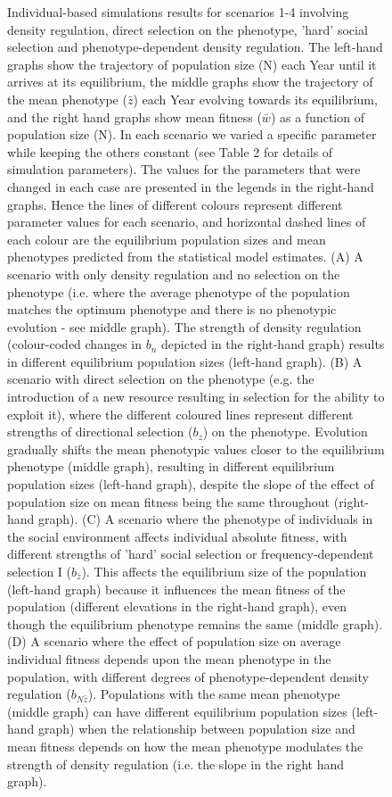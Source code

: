 \documentclass{article}
\begin{document}
\begin{figure}[ht]
	\caption{Individual-based simulations results for scenarios 1-4 involving density regulation, direct selection on the phenotype, 'hard' social selection and phenotype-dependent density regulation. The left-hand graphs show the trajectory of population size (N) each Year until it arrives at its equilibrium, the middle graphs show the trajectory of the mean phenotype ($\bar{z}$) each Year evolving towards its equilibrium, and the right hand graphs show mean fitness ($\bar{w}$) as a function of population size (N). In each scenario we varied a specific parameter while keeping the others constant (see Table 2 for details of simulation parameters). The values for the parameters that were changed in each case are presented in the legends in the right-hand graphs. Hence the lines of different colours represent different parameter values for each scenario, and horizontal dashed lines of each colour are the equilibrium population sizes and mean phenotypes predicted from the statistical model estimates. (A) A scenario with only density regulation and no selection on the phenotype (i.e. where the average phenotype of the population matches the optimum phenotype and there is no phenotypic evolution - see middle graph). The strength of density regulation (colour-coded changes in $b_n$ depicted in the right-hand graph) results in different equilibrium population sizes (left-hand graph). (B) A scenario with direct selection on the phenotype (e.g. the introduction of a new resource resulting in selection for the ability to exploit it), where the different coloured lines represent different strengths of directional selection ($b_z$) on the phenotype. Evolution gradually shifts the mean phenotypic values closer to the equilibrium phenotype (middle graph), resulting in different equilibrium population sizes (left-hand graph), despite the slope of the effect of population size on mean fitness being the same throughout (right-hand graph). (C) A scenario where the phenotype of individuals in the social environment affects individual absolute fitness, with different strengths of 'hard' social selection or frequency-dependent selection I ($b_{\bar{z}}$). This affects the equilibrium size of the population (left-hand graph) because it influences the mean fitness of the population (different elevations in the right-hand graph), even though the equilibrium phenotype remains the same (middle graph). (D) A scenario where the effect of population size on average individual fitness depends upon the mean phenotype in the population, with different degrees of phenotype-dependent density regulation ($b_{N\bar{z}}$). Populations with the same mean phenotype (middle graph) can have different equilibrium population sizes (left-hand graph) when the relationship between population size and mean fitness depends on how the mean phenotype modulates the strength of density regulation (i.e. the slope in the right hand graph).}
	\label{fig:sim2}
\end{figure}
\end{document}
